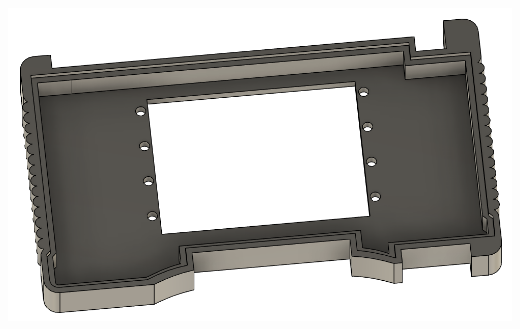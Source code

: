 \includegraphics[width=15cm,height=15cm,keepaspectratio]{Figures/iteration1_top_back.png}
\newpage

